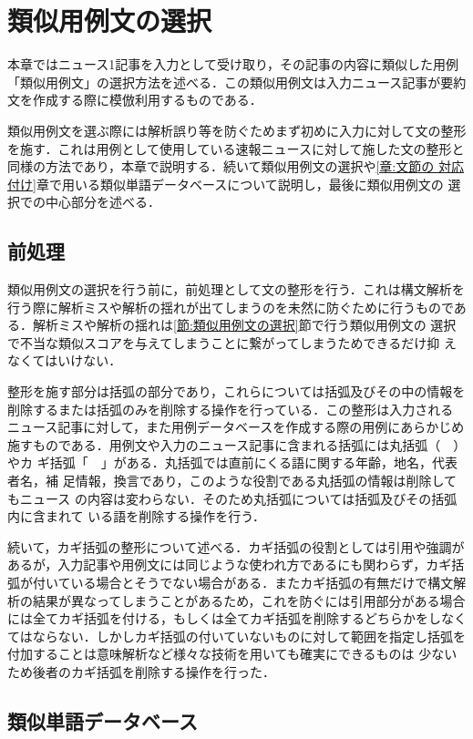 \documentclass[japanese]{jnlp_1.4}
\begin{document}
\section{類似用例文の選択}\label{章:類似用例文の選択}

本章ではニュース1記事を入力として受け取り，その記事の内容に類似した用例
「類似用例文」の選択方法を述べる．この類似用例文は入力ニュース記事が要約
文を作成する際に模倣利用するものである．

類似用例文を選ぶ際には解析誤り等を防ぐためまず初めに入力に対して文の整形
を施す．これは用例として使用している速報ニュースに対して施した文の整形と
同様の方法であり，本章で説明する．続いて類似用例文の選択や\ref{章:文節の
対応付け}章で用いる類似単語データベースについて説明し，最後に類似用例文の
選択での中心部分を述べる．

\subsection{前処理}

類似用例文の選択を行う前に，前処理として文の整形を行う．これは構文解析を
行う際に解析ミスや解析の揺れが出てしまうのを未然に防ぐために行うものであ
る．解析ミスや解析の揺れは\ref{節:類似用例文の選択}節で行う類似用例文の
選択で不当な類似スコアを与えてしまうことに繋がってしまうためできるだけ抑
えなくてはいけない．

整形を施す部分は括弧の部分であり，これらについては括弧及びその中の情報を
削除するまたは括弧のみを削除する操作を行っている．この整形は入力される
ニュース記事に対して，また用例データベースを作成する際の用例にあらかじめ
施すものである．用例文や入力のニュース記事に含まれる括弧には丸括弧（　）やカ
ギ括弧「　」がある．丸括弧では直前にくる語に関する年齢，地名，代表者名，補
足情報，換言であり，このような役割である丸括弧の情報は削除してもニュース
の内容は変わらない．そのため丸括弧については括弧及びその括弧内に含まれて
いる語を削除する操作を行う．

続いて，カギ括弧の整形について述べる．カギ括弧の役割としては引用や強調が
あるが，入力記事や用例文には同じような使われ方であるにも関わらず，カギ括
弧が付いている場合とそうでない場合がある．またカギ括弧の有無だけで構文解
析の結果が異なってしまうことがあるため，これを防ぐには引用部分がある場合
には全てカギ括弧を付ける，もしくは全てカギ括弧を削除するどちらかをしなく
てはならない．しかしカギ括弧の付いていないものに対して範囲を指定し括弧を
付加することは意味解析など様々な技術を用いても確実にできるものは
少ないため後者のカギ括弧を削除する操作を行った．

\subsection{類似単語データベース}\label{節:類似単語データベース}
\end{document}
